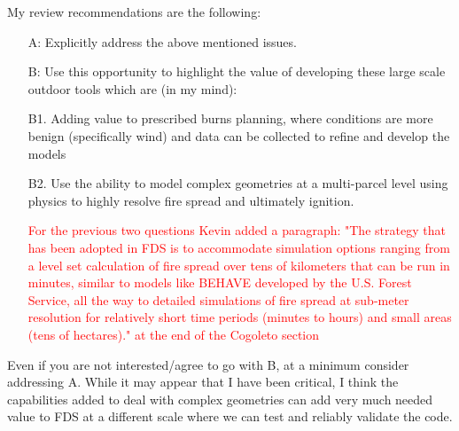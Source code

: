 \documentclass[12pt]{article}
\newcommand\hl[1]{\textcolor{red}{#1}}
\begin{document}
My review recommendations are the following:

\begin{enumerate}
    \item[A:] Explicitly address the above mentioned issues.

    \item[B:] Use this opportunity to highlight the value of developing these large scale outdoor tools which are (in my mind):
    \item[B1.] Adding value to prescribed burns planning, where conditions are more benign (specifically wind) and data can be collected to refine and develop the models
    \item[B2.] Use the ability to model complex geometries at a multi-parcel level using physics to highly resolve fire spread and ultimately ignition.

\hl{For the previous two questions Kevin added a paragraph: "The strategy that has been adopted in FDS is to accommodate simulation options ranging from a level set calculation of fire spread over tens of kilometers that can be run in minutes, similar to models like BEHAVE developed by the U.S. Forest Service, all the way to detailed simulations of fire spread at sub-meter resolution for relatively short time periods (minutes to hours) and small areas (tens of hectares)." at the end of the Cogoleto section}

\end{enumerate}

Even if you are not interested/agree to go with B, at a minimum consider addressing A. While it may appear that I have been critical, I think the capabilities added to deal with complex geometries can add very much needed value to FDS at a different scale where we can test and reliably validate the code. 
\end{document}
